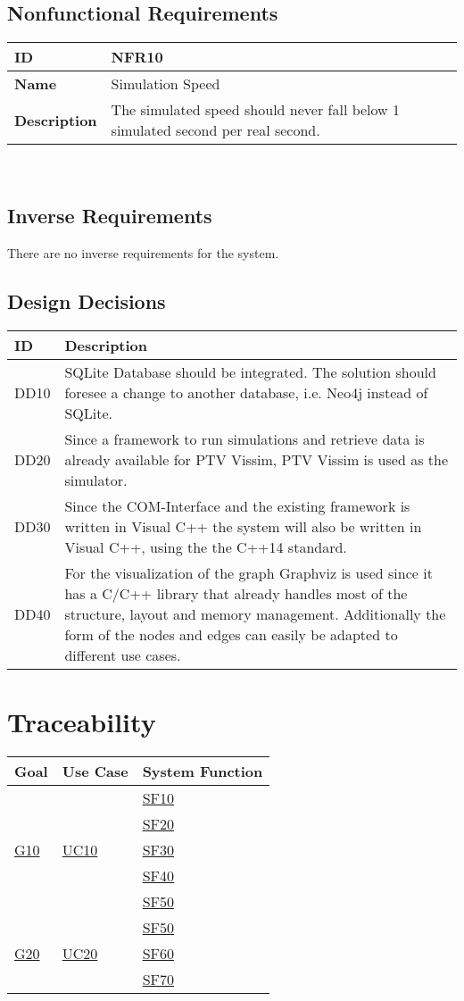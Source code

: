 \documentclass{scrreprt}
\newcommand{\nfr}[3]{
	\label{#1}
	\begin{tabu}{|X[-1,m]|X[l,m]|}
		\hline
		\textbf{ID} & #1\\ \hline
		\textbf{Name} & #2\\ \hline
		\textbf{Description} & #3\\ \hline
	\end{tabu}~\\ 
	}
\newcommand{\myref}[1]{
	\hyperref[#1]{#1}
}
\begin{document}
\section{Nonfunctional Requirements}
	
	\nfr{NFR10}
		{Simulation Speed}
		{The simulated speed should never fall below 1 simulated second per real second.}

\section{Inverse Requirements}
	
	There are no inverse requirements for the system.

\section{Design Decisions}

	\begin{tabu}{|X[-1,m]|X[l,m]|}
		\hline
		\rowfont[l]{\bfseries} ID & Description\\ \hline
		DD10 & SQLite Database should be integrated. The solution should foresee a change to another database, i.e. Neo4j instead of SQLite.\\ \hline
		DD20 & Since a framework to run simulations and retrieve data is already available for PTV Vissim, PTV Vissim is used as the simulator.\\ \hline
		DD30 & Since the COM-Interface and the existing framework is written in Visual C++ the system will also be written in Visual C++, using the the C++14 standard.\\ \hline
		DD40 & For the visualization of the graph Graphviz is used since it has a C/C++ library that already handles most of the structure, layout and memory management. Additionally the form of the nodes and edges can easily be adapted to different use cases.\\ \hline
	\end{tabu}

\chapter{Traceability}
	
	\begin{tabu}{|X[-1,m]|X[-1,m]|X[-1,m]|}
		\hline
		\rowfont[l]{\bfseries} Goal & Use Case & System Function\\ \hline
		\multirow{5}{*}{\myref{G10}} 	& \multirow{5}{*}{\myref{UC10}}	& \myref{SF10}\\
								& 						& \myref{SF20}\\
								&						& \myref{SF30}\\
								&						& \myref{SF40}\\
								&						&\myref{SF50}\\ \hline
		\multirow{3}{*}{\myref{G20}}	& \multirow{3}{*}{\myref{UC20}}	& \myref{SF50}\\
								& 						& \myref{SF60}\\
								&						& \myref{SF70}\\ \hline
	\end{tabu}

\end{document}
